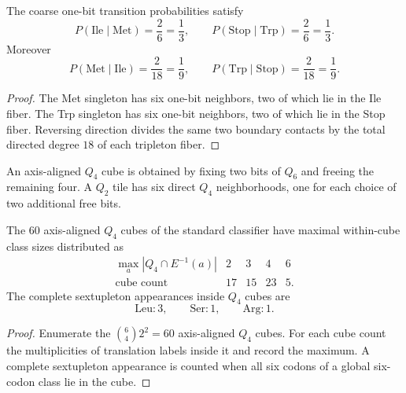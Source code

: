 \begin{theorem}
\label{thm:philosophy-dual-singleton-transition-probabilities}
The coarse one-bit transition probabilities satisfy
$$
  P(\mathrm{Ile}\mid\mathrm{Met})=\frac{2}{6}=\frac{1}{3},
  \qquad
  P(\mathrm{Stop}\mid\mathrm{Trp})=\frac{2}{6}=\frac{1}{3}.
$$
Moreover
$$
  P(\mathrm{Met}\mid\mathrm{Ile})=\frac{2}{18}=\frac{1}{9},
  \qquad
  P(\mathrm{Trp}\mid\mathrm{Stop})=\frac{2}{18}=\frac{1}{9}.
$$
\end{theorem}
\begin{proof}
The Met singleton has six one-bit neighbors, two of which lie in the Ile
fiber. The Trp singleton has six one-bit neighbors, two of which lie in
the Stop fiber. Reversing direction divides the same two boundary
contacts by the total directed degree $18$ of each tripleton fiber.
\end{proof}

\begin{definition}
\label{def:philosophy-q-four-tile-neighborhood}
An axis-aligned $Q_{4}$ cube is obtained by fixing two bits of $Q_{6}$
and freeing the remaining four. A $Q_{2}$ tile has six direct $Q_{4}$
neighborhoods, one for each choice of two additional free bits.
\end{definition}

\begin{theorem}
\label{thm:philosophy-standard-code-q-four-spectrum}
The $60$ axis-aligned $Q_{4}$ cubes of the standard classifier have
maximal within-cube class sizes distributed as
$$
\begin{array}{c|rrrr}
  \max_{a}|Q_{4}\cap E^{-1}(a)| & 2 & 3 & 4 & 6\\
\hline
  \text{cube count} & 17 & 15 & 23 & 5.
\end{array}
$$
The complete sextupleton appearances inside $Q_{4}$ cubes are
$$
  \mathrm{Leu}:3,\qquad
  \mathrm{Ser}:1,\qquad
  \mathrm{Arg}:1.
$$
\end{theorem}
\begin{proof}
Enumerate the $\binom{6}{4}2^{2}=60$ axis-aligned $Q_{4}$ cubes. For
each cube count the multiplicities of translation labels inside it and
record the maximum. A complete sextupleton appearance is counted when
all six codons of a global six-codon class lie in the cube.
\end{proof}

